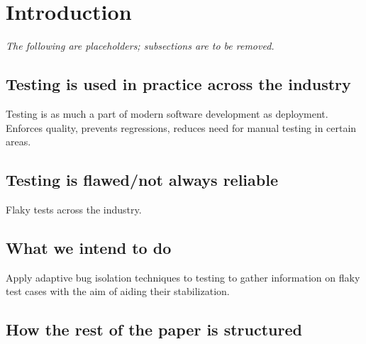 \section{Introduction}
\label{sec:intro}

\textit{The following are placeholders; subsections are to be removed.}

\subsection{Testing is used in practice across the industry}

Testing is as much a part of modern software development as deployment. Enforces quality, prevents regressions, reduces need for manual testing in certain areas.

\subsection{Testing is flawed/not always reliable}

Flaky tests across the industry.

\subsection{What we intend to do}

Apply adaptive bug isolation techniques to testing to gather information on flaky test cases with the aim of aiding their stabilization.

\subsection{How the rest of the paper is structured}